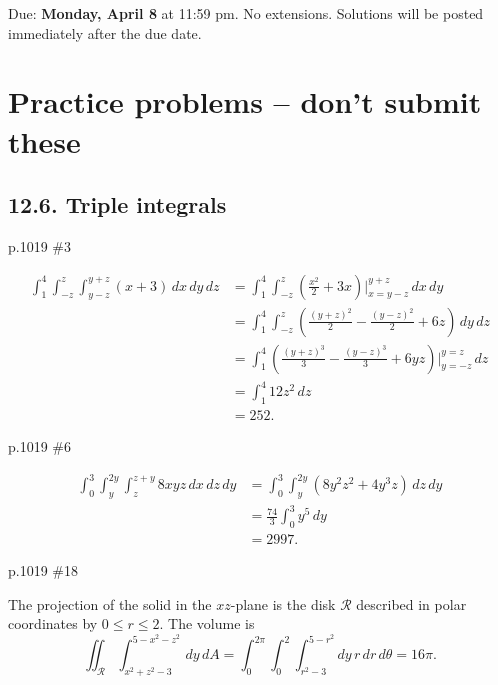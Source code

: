 \maketitle

Due: \textbf{Monday, April 8} at 11:59 pm. No extensions. Solutions will be posted immediately after the due date.

\section{Practice problems -- don't submit these}
\subsection{12.6. Triple integrals}
\begin{practice}p.1019 \#3\end{practice}
\begin{pracsol}
  \[\begin{split}
    \int_1^4\int_{-z}^z\int_{y-z}^{y+z}(x+3)\,dx\,dy\,dz &= \int_1^4\int_{-z}^z \left(\frac{x^2}{2}+3x\right)\Big|_{x=y-z}^{y+z}\,dx\,dy\\
    &= \int_1^4\int_{-z}^z\left(\frac{(y+z)^2}{2}-\frac{(y-z)^2}{2}+6z\right)\,dy\,dz\\
    &= \int_1^4 \left(\frac{(y+z)^3}{3}-\frac{(y-z)^3}{3}+6yz\right)\Big|_{y=-z}^{y=z}\,dz\\
    &= \int_1^4 12z^2\,dz\\
    &= 252.
  \end{split}\]
\end{pracsol}
\begin{practice}p.1019 \#6\end{practice}
\begin{pracsol}
  \[\begin{split}
    \int_0^3\int_y^{2y}\int_z^{z+y}8xyz\,dx\,dz\,dy &= \int_0^3\int_y^{2y}(8y^2z^2+4y^3z)\,dz\,dy\\
    &= \frac{74}{3}\int_0^3 y^5\,dy\\
    &= 2997.
  \end{split}\]
\end{pracsol}
\begin{practice}p.1019 \#18\end{practice}
\begin{pracsol}
  The projection of the solid in the $xz$-plane is the disk $\mathcal R$ described in polar coordinates by $0\leq r\leq 2$. The volume is
  \[\iint_{\mathcal R}\int_{x^2+z^2-3}^{5-x^2-z^2}\,dy\,dA = \int_0^{2\pi}\int_0^2\int_{r^2-3}^{5-r^2}dy\,r\,dr\,d\theta=16\pi.\]
\end{pracsol}
